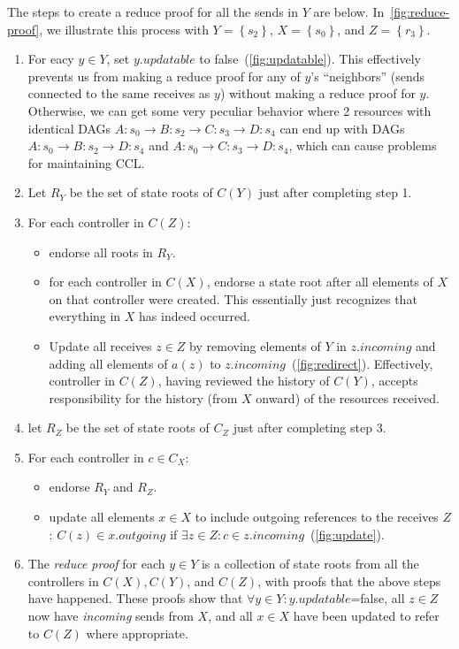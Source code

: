 \documentclass[a4paper,USenglish,cleveref, autoref, thm-restate, anonymous]{lipics-v2021}
\newcommand{\p}[1]{{\ensuremath{\left({{#1}}\right)}}}
\newcommand{\cb}[1]{{\left\{{{#1}}\right\}}}
\begin{document}
The steps to create a reduce proof for all the sends in $Y$ are below. 
In~\cref{fig:reduce-proof}, we illustrate this process with $Y=\cb{s_2}$, $X=\cb{s_0}$, and $Z=\cb{r_3}$. 
\begin{enumerate}
\item For eacy $y\in Y$, set $y.updatable$ to false~(\cref{fig:updatable}). This effectively prevents us from making a reduce proof for any of $y$'s ``neighbors'' (sends connected to the same receives as $y$) without making a reduce proof for $y$.
  Otherwise, we can get some very peculiar behavior where 2 resources with identical DAGs $A:s_0\rightarrow B:s_2 \rightarrow C:s_3 \rightarrow D:s_4$ can end up with DAGs $A:s_0 \rightarrow B:s_2 \rightarrow D:s_4$ and $A:s_0\rightarrow C:s_3 \rightarrow D:s_4$, which can cause problems for maintaining CCL.
\item Let $R_Y$ be the set of state roots of $C\p Y$ just after completing step 1.
\item For each controller in $C\p Z$:
  \begin{itemize}
    \item endorse all roots in $R_Y$.
    \item for each controller in $C\p X$, endorse a state root after all elements of $X$ on that controller were created. This essentially just recognizes that everything in $X$ has indeed occurred. 
    \item Update all receives $z \in Z$ by removing elements of $Y$ in $z.incoming$ and adding all elements of $a\p z$ to $z.incoming$~(\cref{fig:redirect}).
      Effectively, controller in $C\p Z$, having reviewed the history of $C\p Y$, accepts responsibility for the history (from $X$ onward) of the resources received.
  \end{itemize}
\item let $R_Z$ be the set of state roots of $C_Z$ just after completing step 3.
\item For each controller in $c \in C_X$:
  \begin{itemize}
     \item endorse $R_Y$ and $R_Z$.
     \item update all elements $x\in X$ to include outgoing references to the receives $Z$:  $C\p z \in x.outgoing$ if $\exists z \in Z : c \in z.incoming$~(\cref{fig:update}). 
  \end{itemize}
\item The \emph{reduce proof} for each $y\in Y$ is a collection of state roots from all the controllers in $C\p X, C\p Y$, and $C\p Z$, with proofs that the above steps have happened.
      These proofs show that $\forall y\in Y: y.updatable$=false, all $z\in Z$ now have \emph{incoming} sends from $X$, and all $x\in X$ have been updated to refer to $C\p Z$ where appropriate. 
\end{enumerate}
\end{document}

